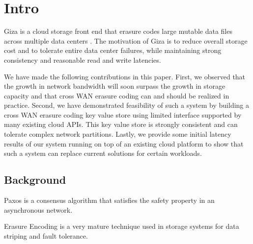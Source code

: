 \section{Intro}
Giza is a cloud storage front end that erasure codes large mutable data files across multiple data centers . The motivation of Giza is to reduce overall storage cost and to tolerate entire data center failures, while maintaining strong consistency and reasonable read and write latencies.
\par
We have made the following contributions in this paper. First, we observed that the growth in network bandwidth will soon surpass the growth in storage capacity and that cross WAN erasure coding can and should be realized in practice. Second, we have demonstrated feasibility of such a system by building a cross WAN erasure coding key value store using limited interface supported by many existing cloud APIs. This key value store is strongly consistent and can tolerate complex network partitions. Lastly, we provide some initial latency results of our system running on top of an existing cloud platform to show that such a system can replace current solutions for certain workloads.

\subsection{Background}
Paxos is a consensus algorithm that satisfies the safety property in an asynchronous network. 
\par
Erasure Encoding is a very mature technique used in storage systems for data striping and fault tolerance.
